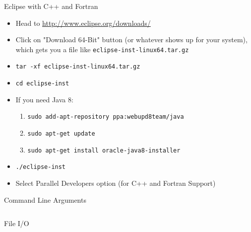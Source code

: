 \documentclass[10pt]{beamer}
\begin{document}
\begin{frame}{Eclipse with C++ and Fortran}

\begin{itemize}
 \item Head to \url{http://www.eclipse.org/downloads/}
 \item Click on "Download 64-Bit" button (or whatever shows up for your system),
       which gets you a file like {\tt eclipse-inst-linux64.tar.gz}
 \item {\tt tar -xf eclipse-inst-linux64.tar.gz}
 \item {\tt cd eclipse-inst}
 \item If you need Java 8:
    \begin{enumerate}
        \item {\tt sudo add-apt-repository ppa:webupd8team/java}
        \item {\tt sudo apt-get update}
        \item {\tt sudo apt-get install oracle-java8-installer}
    \end{enumerate}
 \item {\tt ./eclipse-inst}
 \item Select Parallel Developers option (for C++ and Fortran Support)
\end{itemize}

\end{frame}


\begin{frame}{Command Line Arguments}
\begin{columns}[c]
  \begin{column}{0.5\textwidth}
    
  \end{column}
  \begin{column}{0.5\textwidth}
    
  \end{column}
\end{columns}
\end{frame}


\begin{frame}{File I/O}
\begin{columns}[c]
  \begin{column}{0.5\textwidth}
    
  \end{column}
  \begin{column}{0.5\textwidth}
    
  \end{column}
\end{columns}
\end{frame}
\end{document}
